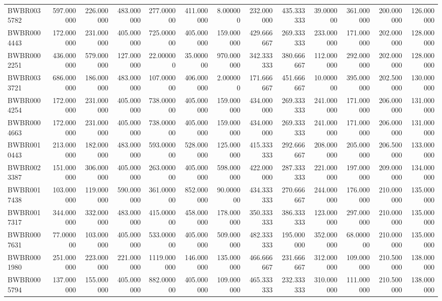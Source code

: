 \begin{longtable}{lrrrrrrrrrrrr}
BWBR0035782 & 597.000000 & 226.000000 & 483.000000 & 277.000000 & 411.000000 & 8.000000 & 232.000000 & 435.333333 & 39.000000 & 361.000000 & 200.000000 & 126.000000 \\
BWBR0004443 & 172.000000 & 231.000000 & 405.000000 & 725.000000 & 405.000000 & 159.000000 & 429.666667 & 269.333333 & 233.000000 & 171.000000 & 202.000000 & 128.000000 \\
BWBR0002251 & 436.000000 & 579.000000 & 127.000000 & 22.000000 & 35.000000 & 970.000000 & 342.333333 & 380.666667 & 112.000000 & 292.000000 & 202.000000 & 128.000000 \\
BWBR0033721 & 686.000000 & 186.000000 & 483.000000 & 107.000000 & 406.000000 & 2.000000 & 171.666667 & 451.666667 & 10.000000 & 395.000000 & 202.500000 & 130.000000 \\
BWBR0004254 & 172.000000 & 231.000000 & 405.000000 & 738.000000 & 405.000000 & 159.000000 & 434.000000 & 269.333333 & 241.000000 & 171.000000 & 206.000000 & 131.000000 \\
BWBR0004663 & 172.000000 & 231.000000 & 405.000000 & 738.000000 & 405.000000 & 159.000000 & 434.000000 & 269.333333 & 241.000000 & 171.000000 & 206.000000 & 131.000000 \\
BWBR0010443 & 213.000000 & 182.000000 & 483.000000 & 593.000000 & 528.000000 & 125.000000 & 415.333333 & 292.666667 & 208.000000 & 205.000000 & 206.500000 & 133.000000 \\
BWBR0023387 & 151.000000 & 306.000000 & 405.000000 & 263.000000 & 405.000000 & 598.000000 & 422.000000 & 287.333333 & 221.000000 & 197.000000 & 209.000000 & 134.000000 \\
BWBR0017438 & 103.000000 & 119.000000 & 590.000000 & 361.000000 & 852.000000 & 90.000000 & 434.333333 & 270.666667 & 244.000000 & 176.000000 & 210.000000 & 135.000000 \\
BWBR0017317 & 344.000000 & 332.000000 & 483.000000 & 415.000000 & 458.000000 & 178.000000 & 350.333333 & 386.333333 & 123.000000 & 297.000000 & 210.000000 & 135.000000 \\
BWBR0007631 & 77.000000 & 103.000000 & 405.000000 & 533.000000 & 405.000000 & 509.000000 & 482.333333 & 195.000000 & 352.000000 & 68.000000 & 210.000000 & 135.000000 \\
BWBR0001980 & 251.000000 & 223.000000 & 221.000000 & 1119.000000 & 146.000000 & 135.000000 & 466.666667 & 231.666667 & 312.000000 & 109.000000 & 210.500000 & 138.000000 \\
BWBR0005794 & 137.000000 & 155.000000 & 405.000000 & 882.000000 & 405.000000 & 109.000000 & 465.333333 & 232.333333 & 310.000000 & 111.000000 & 210.500000 & 138.000000 \\

\end{longtable}
